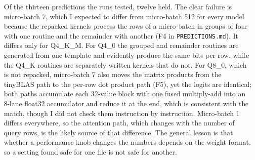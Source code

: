Of the thirteen predictions the runs tested, twelve held. The clear failure is micro-batch 7, which I
expected to differ from micro-batch 512 for every model because the repacked kernels process
the rows of a micro-batch in groups of four with one routine and the remainder with another
(F4 in \texttt{PREDICTIONS.md}). It differs only for Q4\_K\_M. For Q4\_0 the grouped and
remainder routines are generated from one template and evidently produce the same bits per row,
while the Q4\_K routines are separately written kernels that do not. For Q8\_0, which is not
repacked, micro-batch 7 also moves the matrix products from the tinyBLAS path to the per-row
dot product path (F5), yet the logits are identical; both paths accumulate each 32-value block
with one fused multiply-add into an 8-lane float32 accumulator and reduce it at the end, which is
consistent with the match, though I did not check them instruction by instruction. Micro-batch
1 differs everywhere, so the attention path, which changes with the number of query rows, is the
likely source of that difference. The general lesson is that whether a performance knob changes
the numbers depends on the weight format, so a setting found safe for one file is not safe for
another.
